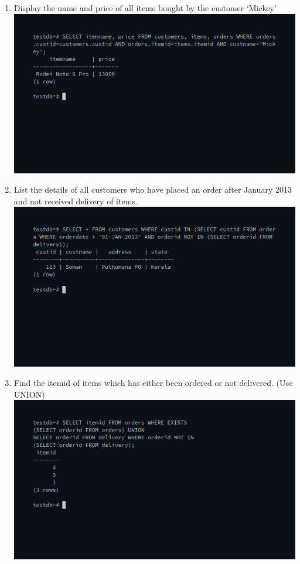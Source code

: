 \documentclass[10pt,a4paper,titlepage]{report}
\begin{document}
{\begin{enumerate}
	\item Display the name and price of all items bought by the customer ‘Mickey’\newline
	\includegraphics[width=\linewidth]{../Images/Joins/4.png}
	\item List the details of all customers who have placed an order after January 2013 and not received delivery of items.\newline
	\includegraphics[width=\linewidth]{../Images/Joins/5.png}
	\item Find the itemid of items which has either been ordered or not delivered. (Use UNION)\newline
	\includegraphics[width=\linewidth]{../Images/Joins/6.png}

\end{enumerate}}
\end{document}
